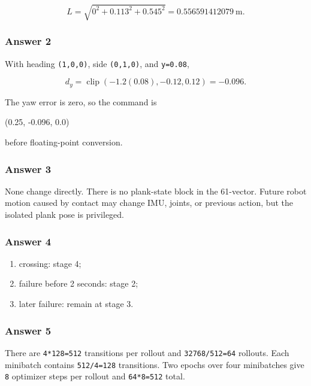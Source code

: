 \documentclass[
  american,
  11pt,
  letterpaper,
]{article}
\newenvironment{Shaded}{\begin{snugshade}}{\end{snugshade}}
\newcommand{\NormalTok}[1]{#1}
\providecommand{\tightlist}{%
  \setlength{\itemsep}{0pt}\setlength{\parskip}{0pt}}
\renewenvironment{Shaded}{\par\smallskip}{\par\smallskip}
\begin{document}
\[
L=\sqrt{0^2+0.113^2+0.545^2}=0.556591412079\ \text{m}.
\]

\subsubsection{Answer 2}\label{answer-2}

With heading \texttt{(1,0,0)}, side \texttt{(0,1,0)}, and
\texttt{y=0.08},

\[
d_y=\operatorname{clip}(-1.2(0.08),-0.12,0.12)=-0.096.
\]

The yaw error is zero, so the command is

\begin{Shaded}
\begin{Highlighting}[]
\NormalTok{(0.25, {-}0.096, 0.0)}
\end{Highlighting}
\end{Shaded}

before floating-point conversion.

\subsubsection{Answer 3}\label{answer-3}

None change directly. There is no plank-state block in the 61-vector.
Future robot motion caused by contact may change IMU, joints, or
previous action, but the isolated plank pose is privileged.

\subsubsection{Answer 4}\label{answer-4}

\begin{enumerate}
\def\labelenumi{\arabic{enumi}.}
\tightlist
\item
  crossing: stage 4;
\item
  failure before 2 seconds: stage 2;
\item
  later failure: remain at stage 3.
\end{enumerate}

\subsubsection{Answer 5}\label{answer-5}

There are \texttt{4*128=512} transitions per rollout and
\texttt{32768/512=64} rollouts. Each minibatch contains
\texttt{512/4=128} transitions. Two epochs over four minibatches give
\texttt{8} optimizer steps per rollout and \texttt{64*8=512} total.
\end{document}
